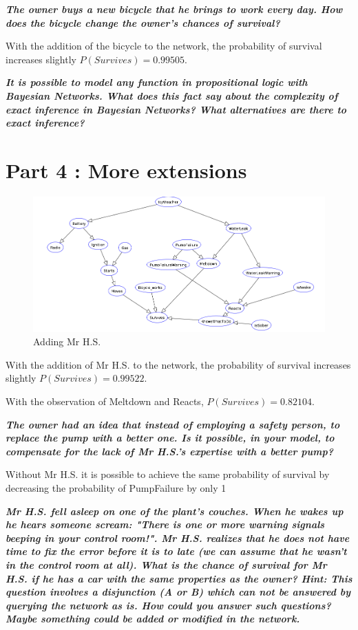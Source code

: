 \textit{\textbf{The owner buys a new bicycle that he brings to work every day.
How does the bicycle change the owner's chances of survival?}}

\vspace{1em}
With the addition of the bicycle to the network, the probability of survival
increases slightly $P(Survives)=0.99505$.

\textit{\textbf{It is possible to model any function in propositional
logic with Bayesian Networks. What does this fact say about the complexity
of exact inference in Bayesian Networks? What alternatives are there
to exact inference?}}



\newpage
\thispagestyle{empty}
\section*{Part 4 : More extensions}

\begin{figure}[h]
    \centering
      \includegraphics[width=0.83\linewidth]{./images/lab3.png}
    \caption{Adding Mr H.S.\label{graph}}
\end{figure}

With the addition of Mr H.S. to the network, the probability of survival
increases slightly $P(Survives)=0.99522$.

With the observation of Meltdown and Reacts, $P(Survives)=0.82104$.

\textit{\textbf{The owner had an idea that instead of employing a safety person,
to replace the pump with a better one. Is it possible, in your model, to
compensate for the lack of Mr H.S.'s expertise with a better pump?}}

\vspace{1em}
Without Mr H.S. it is possible to achieve the same probability of survival by
decreasing the probability of PumpFailure by only 1%

\textit{\textbf{Mr H.S. fell asleep on one of the plant's couches.
 When he wakes up he hears someone scream: "There is one or more warning
 signals beeping in your control room!". Mr H.S. realizes that he does not
 have time to fix the error before it is to late (we can assume that he wasn't
  in the control room at all). What is the chance of survival for Mr H.S. if he
   has a car with the same properties as the owner? Hint: This question involves
    a disjunction (A or B) which can not be answered by querying the network
    as is. How could you answer such questions? Maybe something could be added
    or modified in the network.}}

